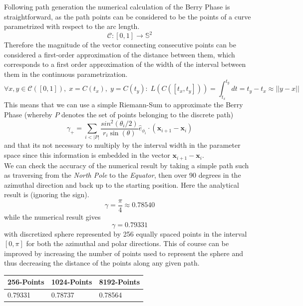 \documentclass{article}
\begin{document}
Following path generation the numerical calculation of the Berry Phase is straightforward, as the path points can be considered to be the points of a curve parametrized with respect to the arc length.
  \begin{equation*}
    \mathcal{C}: [0,1] \rightarrow \mathbb{S}^{2}
  \end{equation*}
Therefore the magnitude of the vector connecting consecutive points can be considered a first-order approximation of the distance between them, which corresponds to a first order approximation of the width of the interval between them in the continuous parametrization.
\begin{equation*}
  \forall x, y \in \mathcal{C}([0, 1]), \; x = C(t_x), \; y = C(t_y): \; L(C([t_x, t_y])) = \int_{t_{x}}^{t_{y}}dt = t_{y} - t_{x} \approx ||y - x||
\end{equation*}
This means that we can use a simple Riemann-Sum to approximate the Berry Phase (whereby $P$ denotes the set of points belonging to the discrete path)
\begin{equation*}
  \gamma_{+} = \sum_{i < |P|} \frac{sin^{2}(\theta_{i}/2)}{r_{i}\sin(\theta)}\hat{e}_{\phi_{i}} \cdot (\bm{x}_{i + 1} - \bm{x}_{i})
\end{equation*}
and that its not necessary to multiply by the interval width in the parameter space since this information is embedded in the vector $\bm{x}_{i + 1} - \bm{x}_{i}$.\\

We can check the accuracy of the numerical result by taking a simple path such as traversing from the \textit{North Pole} to the \textit{Equator}, then over 90 degrees in the azimuthal direction and back up to the starting position. Here the analytical result is (ignoring the sign).
\begin{equation*}
  \gamma = \frac{\pi}{4} \approx 0.78540
\end{equation*}
while the numerical result gives
\begin{equation*}
  \gamma = 0.79331
\end{equation*}
with discretized sphere represented by 256 equally spaced points in the interval $[0, \pi]$ for both the azimuthal and polar directions. This of course can be improved by increasing the number of points used to represent the sphere and thus decreasing the distance of the points along any given path.

\begin{table}[h]
  \centering
  \begin{tabular}{||l|l|l||}
    \hline
    \textbf{256-Points} & \textbf{1024-Points} & \textbf{8192-Points}\\
    \hline
    0.79331 & 0.78737 & 0.78564\\
    \hline
  \end{tabular}
\end{table}
\end{document}
